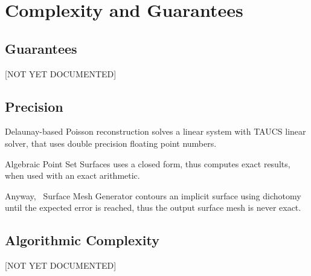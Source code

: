 \section{Complexity and Guarantees}


\subsection{Guarantees}

[NOT YET DOCUMENTED]


\subsection{Precision}

Delaunay-based Poisson reconstruction solves a linear system with TAUCS
linear solver, that uses double precision floating point
numbers.

Algebraic Point Set Surfaces uses a closed form, thus computes exact results, when used with an exact arithmetic.

Anyway, \cgal\ Surface Mesh Generator contours an implicit surface using dichotomy
until the expected error is reached, thus the output surface mesh is never exact.


\subsection{Algorithmic Complexity}

[NOT YET DOCUMENTED]

